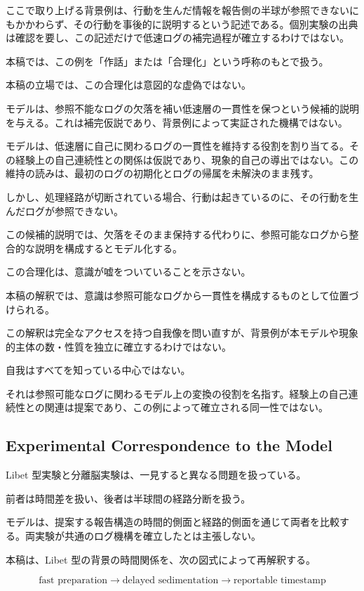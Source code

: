 ここで取り上げる背景例は、行動を生んだ情報を報告側の半球が参照できないにもかかわらず、その行動を事後的に説明するという記述である。個別実験の出典は確認を要し、この記述だけで低速ログの補完過程が確立するわけではない。

本稿では、この例を「作話」または「合理化」という呼称のもとで扱う。

本稿の立場では、この合理化は意図的な虚偽ではない。

モデルは、参照不能なログの欠落を補い低速層の一貫性を保つという候補的説明を与える。これは補完仮説であり、背景例によって実証された機構ではない。

モデルは、低速層に自己に関わるログの一貫性を維持する役割を割り当てる。その経験上の自己連続性との関係は仮説であり、現象的自己の導出ではない。この維持の読みは、最初のログの初期化とログの帰属を未解決のまま残す。

しかし、処理経路が切断されている場合、行動は起きているのに、その行動を生んだログが参照できない。

この候補的説明では、欠落をそのまま保持する代わりに、参照可能なログから整合的な説明を構成するとモデル化する。

この合理化は、意識が嘘をついていることを示さない。

本稿の解釈では、意識は参照可能なログから一貫性を構成するものとして位置づけられる。

この解釈は完全なアクセスを持つ自我像を問い直すが、背景例が本モデルや現象的主体の数・性質を独立に確立するわけではない。

自我はすべてを知っている中心ではない。

それは参照可能なログに関わるモデル上の変換の役割を名指す。経験上の自己連続性との関連は提案であり、この例によって確立される同一性ではない。

\subsection{Experimental Correspondence to the Model}

Libet 型実験と分離脳実験は、一見すると異なる問題を扱っている。

前者は時間差を扱い、後者は半球間の経路分断を扱う。

モデルは、提案する報告構造の時間的側面と経路的側面を通じて両者を比較する。両実験が共通のログ機構を確立したとは主張しない。

本稿は、Libet 型の背景の時間関係を、次の図式によって再解釈する。

\begin{equation}
\text{fast preparation}
\rightarrow
\text{delayed sedimentation}
\rightarrow
\text{reportable timestamp}
\end{equation}

